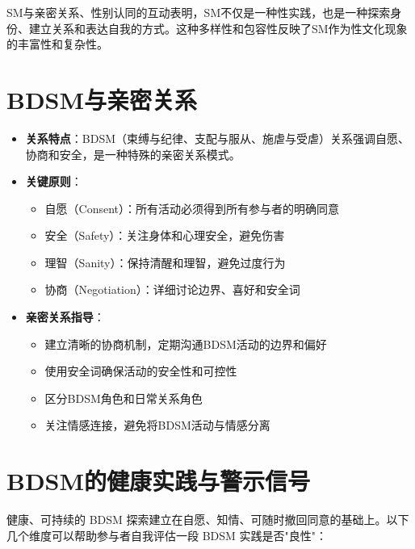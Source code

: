 \documentclass[12pt,UTF8]{ctexbook}
\begin{document}
SM与亲密关系、性别认同的互动表明，SM不仅是一种性实践，也是一种探索身份、建立关系和表达自我的方式。这种多样性和包容性反映了SM作为性文化现象的丰富性和复杂性。

\section{BDSM与亲密关系}

\begin{itemize}
\item \textbf{关系特点}：BDSM（束缚与纪律、支配与服从、施虐与受虐）关系强调自愿、协商和安全，是一种特殊的亲密关系模式。
\item \textbf{关键原则}：
  \begin{itemize}
  \item 自愿（Consent）：所有活动必须得到所有参与者的明确同意
  \item 安全（Safety）：关注身体和心理安全，避免伤害
  \item 理智（Sanity）：保持清醒和理智，避免过度行为
  \item 协商（Negotiation）：详细讨论边界、喜好和安全词
  \end{itemize}
\item \textbf{亲密关系指导}：
  \begin{itemize}
  \item 建立清晰的协商机制，定期沟通BDSM活动的边界和偏好
  \item 使用安全词确保活动的安全性和可控性
  \item 区分BDSM角色和日常关系角色
  \item 关注情感连接，避免将BDSM活动与情感分离
  \end{itemize}
\end{itemize}

\section{BDSM的健康实践与警示信号}

健康、可持续的 BDSM 探索建立在自愿、知情、可随时撤回同意的基础上。以下几个维度可以帮助参与者自我评估一段 BDSM 实践是否"良性"：
\end{document}
